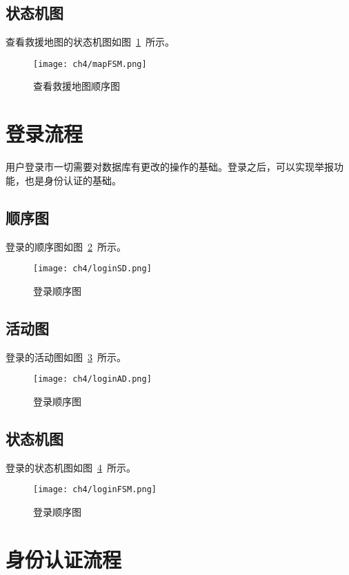 \subsection{状态机图}
查看救援地图的状态机图如图~\ref{fig:mapFSM}~所示。
\begin{figure}[htbp]
    \centering
    \texttt{[image: ch4/mapFSM.png]}
    \caption{查看救援地图顺序图}\label{fig:mapFSM}
    \vspace{\baselineskip} %
\end{figure}

\section{登录流程}
用户登录市一切需要对数据库有更改的操作的基础。登录之后，可以实现举报功能，也是身份认证的基础。
\subsection{顺序图}
登录的顺序图如图~\ref{fig:loginSD}~所示。
\begin{figure}[htbp]
    \centering
    \texttt{[image: ch4/loginSD.png]}
    \caption{登录顺序图}\label{fig:loginSD}
    \vspace{\baselineskip} %
\end{figure}
\subsection{活动图}
登录的活动图如图~\ref{fig:loginAD}~所示。
\begin{figure}[htbp]
    \centering
    \texttt{[image: ch4/loginAD.png]}
    \caption{登录顺序图}\label{fig:loginAD}
    \vspace{\baselineskip} %
\end{figure}
\subsection{状态机图}
登录的状态机图如图~\ref{fig:loginFSM}~所示。
\begin{figure}[htbp]
    \centering
    \texttt{[image: ch4/loginFSM.png]}
    \caption{登录顺序图}\label{fig:loginFSM}
    \vspace{\baselineskip} %
\end{figure}

\section{身份认证流程}
